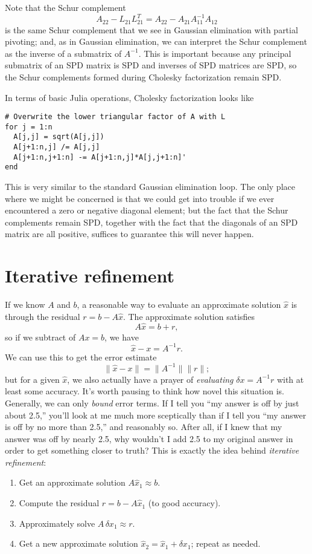 \documentclass[12pt, leqno]{article}
\begin{document}
Note that the Schur complement
\[
  A_{22}-L_{21} L_{21}^T = A_{22} - A_{21} A_{11}^{-1} A_{12}
\]
is the same Schur complement that we see in Gaussian elimination
with partial pivoting; and, as in Gaussian elimination, we can
interpret the Schur complement as the inverse of a submatrix
of $A^{-1}$.  This is important because any principal submatrix of
an SPD matrix is SPD and inverses of SPD matrices are SPD, so
the Schur complements formed during Cholesky factorization remain
SPD.

In terms of basic Julia operations, Cholesky factorization looks like
\begin{lstlisting}
# Overwrite the lower triangular factor of A with L
for j = 1:n
  A[j,j] = sqrt(A[j,j])
  A[j+1:n,j] /= A[j,j]
  A[j+1:n,j+1:n] -= A[j+1:n,j]*A[j,j+1:n]'
end
\end{lstlisting}
This is very similar to the standard Gaussian elimination loop.
The only place where we might be concerned is that we could get
into trouble if we ever encountered a zero or negative diagonal
element; but the fact that the Schur complements remain SPD, together
with the fact that the diagonals of an SPD matrix are all positive,
suffices to guarantee this will never happen.

\section{Iterative refinement}

If we know $A$ and $b$, a reasonable way to evaluate an approximate
solution $\hat{x}$ is through the residual $r = b-A\hat{x}$.  The
approximate solution satisfies
\[
  A \hat{x} = b + r,
\]
so if we subtract of $Ax = b$, we have
\[
  \hat{x}-x = A^{-1} r.
\]
We can use this to get the error estimate
\[
  \|\hat{x}-x\| = \|A^{-1}\| \|r\|;
\]
but for a given $\hat{x}$, we also actually have a prayer of {\em evaluating}
$\delta x = A^{-1} r$ with at least some accuracy.
%
It's worth pausing to think how novel this situation is.
Generally, we can only {\em bound} error terms.
If I tell you ``my answer is off by just about 2.5,''
you'll look at me much more sceptically than if I tell
you ``my answer is off by no more than 2.5,'' and reasonably so.
After all, if I knew that my answer was off by nearly 2.5, why wouldn't
I add 2.5 to my original answer in order to get something closer to truth?
This is exactly the idea behind {\em iterative refinement}:
\begin{enumerate}
\item
  Get an approximate solution $A \hat{x}_1 \approx b$.
\item
  Compute the residual $r = b-A\hat{x}_1$ (to good accuracy).
\item
  Approximately solve $A \, \delta x_1 \approx r$.
\item
  Get a new approximate solution $\hat{x}_2 = \hat{x}_1+\delta x_1$;
  repeat as needed.
\end{enumerate}
\end{document}
